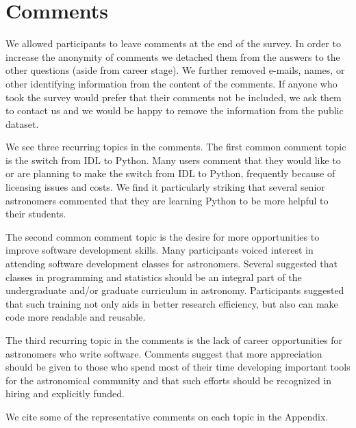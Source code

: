 \section{Comments}
\label{sec:comments}

We allowed participants to leave comments at the end of the survey. In order to increase the anonymity of comments we detached them from the answers to the other questions (aside from career stage). We further removed e-mails, names, or other identifying information from the content of the comments. If anyone who took the survey would prefer that their comments not be included, we ask them to contact us and we would be happy to remove the information from the public dataset. 

We see three recurring topics in the comments. The first common comment topic is the switch from IDL to Python. Many users comment that they would like to or are planning to make the switch from IDL to Python, frequently because of licensing issues and costs. We find it particularly striking that several senior astronomers commented that they are learning Python to be more helpful to their students.

The second common comment topic is the desire for more opportunities to improve software development skills. Many participants voiced interest in attending software development classes for astronomers. Several suggested that classes in programming and statistics should be an integral part of the undergraduate and/or graduate curriculum in astronomy. Participants suggested that such training not only aids in better research efficiency, but also can make code more readable and reusable. 

The third recurring topic in the comments is the lack of career opportunities for astronomers who write software. Comments suggest that more appreciation should be given to those who spend most of their time developing important tools for the astronomical community and that such efforts should be recognized in hiring and explicitly funded. 

We cite some of the representative comments on each topic in the Appendix.

    